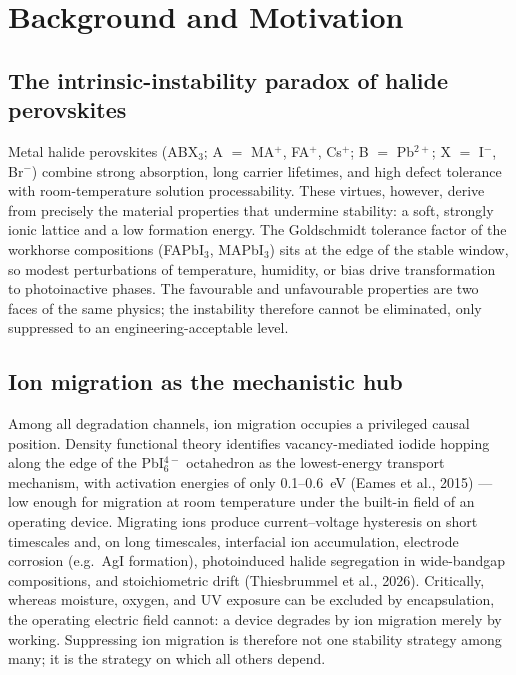 \documentclass[11pt,a4paper]{article}
\begin{document}
\tableofcontents
\newpage

\section{Background and Motivation}

\subsection{The intrinsic-instability paradox of halide perovskites}
Metal halide perovskites (ABX$_3$; A $=$ MA$^+$, FA$^+$, Cs$^+$; B $=$ Pb$^{2+}$;
X $=$ I$^-$, Br$^-$) combine strong absorption, long carrier lifetimes, and high defect
tolerance with room-temperature solution processability. These virtues, however, derive
from precisely the material properties that undermine stability: a soft, strongly ionic
lattice and a low formation energy. The Goldschmidt tolerance factor of the workhorse
compositions (FAPbI$_3$, MAPbI$_3$) sits at the edge of the stable window, so modest
perturbations of temperature, humidity, or bias drive transformation to photoinactive
phases. The favourable and unfavourable properties are two faces of the same physics;
the instability therefore cannot be eliminated, only suppressed to an
engineering-acceptable level.

\subsection{Ion migration as the mechanistic hub}
Among all degradation channels, ion migration occupies a privileged causal position.
Density functional theory identifies vacancy-mediated iodide hopping along the edge of
the PbI$_6^{4-}$ octahedron as the lowest-energy transport mechanism, with activation
energies of only 0.1--0.6~eV (Eames et al., 2015) --- low enough for migration at room
temperature under the built-in field of an operating device. Migrating ions produce
current--voltage hysteresis on short timescales and, on long timescales, interfacial
ion accumulation, electrode corrosion (e.g.\ AgI formation), photoinduced halide
segregation in wide-bandgap compositions, and stoichiometric drift (Thiesbrummel et
al., 2026). Critically, whereas moisture, oxygen, and UV exposure can be excluded by
encapsulation, the operating electric field cannot: a device degrades by ion migration
merely by working. Suppressing ion migration is therefore not one stability strategy
among many; it is the strategy on which all others depend.
\end{document}
